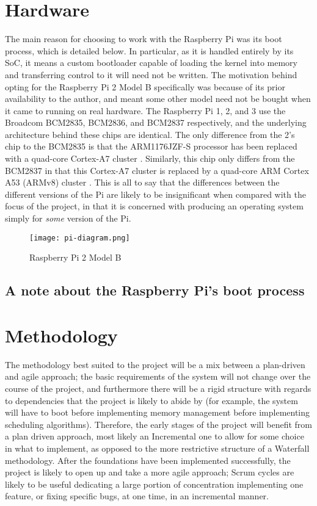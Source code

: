 \documentclass[10pt,a4paper]{article}
\begin{document}
\section*{Hardware}
The main reason for choosing to work with the Raspberry Pi was its boot process,
which is detailed below. In particular, as it is handled entirely by its SoC, it
means a custom bootloader capable of loading the kernel into memory and
transferring control to it will need not be written. The motivation behind
opting for the Raspberry Pi 2 Model B specifically was because of its prior
availability to the author, and meant some other model need not be bought when
it came to running on real hardware. The Raspberry Pi 1, 2, and 3 use the
Broadcom BCM2835, BCM2836, and BCM2837 respectively, and the underlying
architecture behind these chips are identical. The only difference from the 2's
chip to the BCM2835 is that the ARM1176JZF-S processor has been replaced with a
quad-core Cortex-A7 cluster \cite{BCM2835}. Similarly, this chip only differs
from the BCM2837 in that this Cortex-A7 cluster is replaced by a quad-core ARM
Cortex A53 (ARMv8) cluster \cite{BCM2837}. This is all to say that the
differences between the different versions of the Pi are likely to be
insignificant when compared with the focus of the project, in that it is
concerned with producing an operating system simply for \textit{some} version of
the Pi.

\begin{center}
    \begin{figure}[h]
        \texttt{[image: pi-diagram.png]}
        \caption{Raspberry Pi 2 Model B}
    \end{figure}
\end{center}

\subsection*{A note about the Raspberry Pi's boot process}


\section*{Methodology}
The methodology best suited to the project will be a mix between a plan-driven
and agile approach; the basic requirements of the system will not change over
the course of the project, and furthermore there will be a rigid structure with
regards to dependencies that the project is likely to abide by (for example, the
system will have to boot before implementing memory management before
implementing scheduling algorithms). Therefore, the early stages of the project
will benefit from a plan driven approach, most likely an Incremental one to
allow for some choice in what to implement, as opposed to the more restrictive
structure of a Waterfall methodology. After the foundations have been
implemented successfully, the project is likely to open up and take a more agile
approach; Scrum cycles are likely to be useful dedicating a large portion of
concentration implementing one feature, or fixing specific bugs, at one time, in
an incremental manner.
\end{document}
